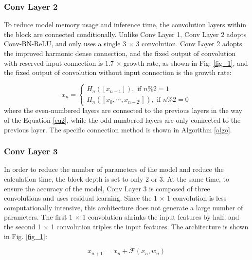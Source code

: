 \documentclass[default,iicol]{sn-jnl}
\theoremstyle{thmstyleone}\newtheorem{theorem}{Theorem}\newtheorem{proposition}[theorem]{Proposition}
\theoremstyle{thmstyletwo}\newtheorem{example}{Example}\newtheorem{remark}{Remark}
\theoremstyle{thmstylethree}\newtheorem{definition}{Definition}
\begin{document}
\subsubsection{Conv Layer 2}
To reduce model memory usage and inference time, the convolution layers within the block are connected conditionally. Unlike Conv Layer 1, Conv Layer 2 adopts Conv-BN-ReLU, and only uses a single 3 × 3 convolution. Conv Layer 2 adopts the improved harmonic dense connection, and the fixed output of convolution with reserved input connection is 1.7 × growth rate, as shown in Fig. \ref{fig_1}, and the fixed output of convolution without input connection is the growth rate:

\begin{equation}
x_{n}=\left\{\begin{array}{c}
H_{n}\left(\left[x_{n-1}\right]\right), \text { if } n \% 2=1 \\
H_{n}\left(\left[x_{0}, \cdots, x_{n-2{ }^{i}}\right]\right), \text { if } n \% 2=0
\end{array}\right.
\label{eq2}
\end{equation}
where the even-numbered layers are connected to the previous layers in the way of the Equation \ref{eq2}, while the odd-numbered layers are only connected to the previous layer. The specific connection method is shown in Algorithm \ref{algo}.

\subsubsection{Conv Layer 3}
In order to reduce the number of parameters of the model and reduce the calculation time, the block depth is set to only 2 or 3. At the same time, to ensure the accuracy of the model, Conv Layer 3 is composed of three convolutions and uses residual learning. Since the 1 × 1 convolution is less computationally intensive, this architecture does not generate a large number of parameters. The first 1 × 1 convolution shrinks the input features by half, and the second 1 × 1 convolution triples the input features. The architecture is shown in Fig. \ref{fig_1}:

\begin{equation}
x_{n+1}=\ x_n + \mathcal{F}\left(x_n,w_n\right)
\label{eq3}
\end{equation}
\end{document}
